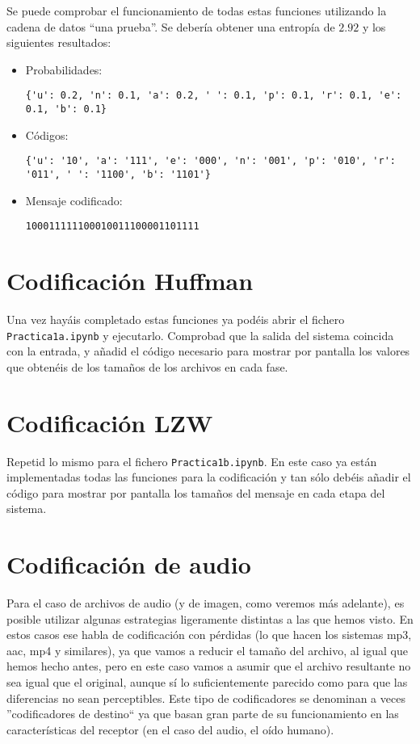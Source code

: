 \documentclass[es,practica]{uah}
\begin{document}
Se puede comprobar el funcionamiento de todas estas funciones utilizando la cadena de datos ``una prueba''. Se debería obtener una entropía de $2.92$ y los siguientes resultados:
\begin{itemize}
	\item Probabilidades: \begin{verbatim}{'u': 0.2, 'n': 0.1, 'a': 0.2, ' ': 0.1, 'p': 0.1, 'r': 0.1, 'e': 0.1, 'b': 0.1}\end{verbatim}
	\item Códigos: \begin{verbatim}{'u': '10', 'a': '111', 'e': '000', 'n': '001', 'p': '010', 'r': '011', ' ': '1100', 'b': '1101'}\end{verbatim}
	\item Mensaje codificado: \begin{verbatim}100011111100010011100001101111\end{verbatim}
	

\end{itemize}


\section{Codificación Huffman}
Una vez hayáis completado estas funciones ya podéis abrir el fichero \texttt{Practica1a.ipynb} y ejecutarlo. Comprobad que la salida del sistema coincida con la entrada, y añadid el código necesario para mostrar por pantalla los valores que obtenéis de los tamaños de los archivos en cada fase.

\section{Codificación LZW}

Repetid lo mismo para el fichero \texttt{Practica1b.ipynb}. En este caso ya están implementadas todas las funciones para la codificación y tan sólo debéis añadir el código para mostrar por pantalla los tamaños del mensaje en cada etapa del sistema.

\section{Codificación de audio}
Para el caso de archivos de audio (y de imagen, como veremos más adelante), es posible utilizar algunas estrategias ligeramente distintas a las que hemos visto. En estos casos ese habla de codificación con pérdidas (lo que hacen los sistemas mp3, aac, mp4 y similares), ya que vamos a reducir el tamaño del archivo, al igual que hemos hecho antes, pero en este caso vamos a asumir que el archivo resultante no sea igual que el original, aunque sí lo suficientemente parecido como para que las diferencias no sean perceptibles. Este tipo de codificadores se denominan a veces ''codificadores de destino`` ya que basan gran parte de su funcionamiento en las características del receptor (en el caso del audio, el oído humano).
\end{document}

